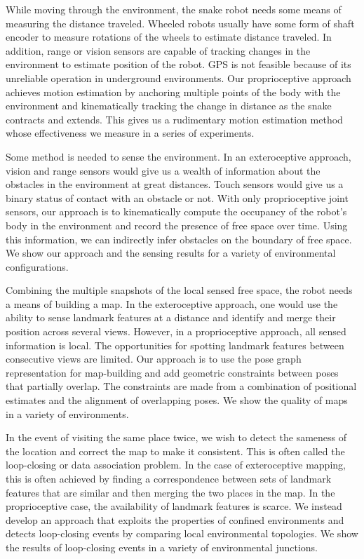 While moving through the environment, the snake robot needs some means of measuring the distance traveled. Wheeled robots usually have some form of shaft encoder to measure rotations of the wheels to estimate distance traveled. In addition, range or vision sensors are capable of tracking changes in the environment to estimate position of the robot. GPS is not feasible because of its unreliable operation in underground environments. Our proprioceptive approach achieves motion estimation by anchoring multiple points of the body with the environment and kinematically tracking the change in distance as the snake contracts and extends. This gives us a rudimentary motion estimation method whose effectiveness we measure in a series of experiments.

Some method is needed to sense the environment. In an exteroceptive approach, vision and range sensors would give us a wealth of information about the obstacles in the environment at great distances. Touch sensors would give us a binary status of contact with an obstacle or not. With only proprioceptive joint sensors, our approach is to kinematically compute the occupancy of the robot’s body in the environment and record the presence of free space over time. Using this information, we can indirectly infer obstacles on the boundary of free space. We show our approach and the sensing results for a variety of environmental configurations.

Combining the multiple snapshots of the local sensed free space, the robot needs a means of building a map. In the exteroceptive approach, one would use the ability to sense landmark features at a distance and identify and merge their position across several views. However, in a proprioceptive approach, all sensed information is local. The opportunities for spotting landmark features between consecutive views are limited. Our approach is to use the pose graph representation for map-building and add geometric constraints between poses that partially overlap. The constraints are made from a combination of positional estimates and the alignment of overlapping poses. We show the quality of maps in a variety of environments.

In the event of visiting the same place twice, we wish to detect the sameness of the location and correct the map to make it consistent. This is often called the loop-closing or data association problem. In the case of exteroceptive mapping, this is often achieved by finding a correspondence between sets of landmark features that are similar and then merging the two places in the map. In the proprioceptive case, the availability of landmark features is scarce. We instead develop an approach that exploits the properties of confined environments and detects loop-closing events by comparing local environmental topologies. We show the results of loop-closing events in a variety of environmental junctions.

